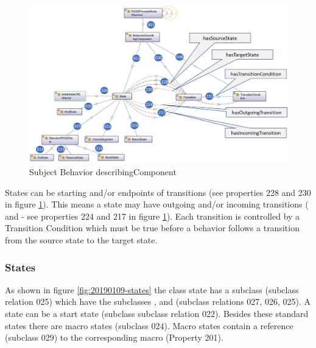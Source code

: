 \begin{figure}[htbp]
	\centering
	\includegraphics[width=1.0\linewidth]{Figures/Ontology/SubjectBehavior/20190104-Behavior-describing-component}
	\caption[Subject Behavior describing Component]{Subject Behavior describingComponent}
	\label{fig:20190104-behavior-describing-component}
\end{figure}

States can be starting and/or endpoints of transitions (see properties 228 and 230 in figure \ref{fig:20190104-behavior-describing-component}). This means a state may have outgoing and/or incoming transitions (  and  - see properties 224 and 217 in figure \ref{fig:20190104-behavior-describing-component}). Each transition is controlled by a Transition Condition which must be true before a behavior follows a transition from the source state to the target state.

\subsubsection{States}

As shown in figure \ref{fig:20190109-states} the class state has a subclass  (subclass relation 025) which have the subclasses ,  and (subclass relations 027, 026, 025). A state can be a start state (subclass  subclass relation 022). Besides these standard states there are macro states (subclass 024). Macro states contain a reference (subclass 029) to the corresponding macro (Property 201).

